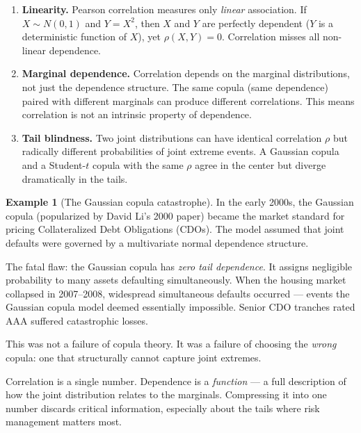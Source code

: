 \documentclass[11pt, a4paper]{article}
\theoremstyle{definition}
\newtheorem{example}{Example}[section]
\theoremstyle{plain}
\theoremstyle{remark}
\begin{document}
\begin{enumerate}
    \item \textbf{Linearity.}
    Pearson correlation measures only \emph{linear} association.
    If $X \sim N(0,1)$ and $Y = X^2$, then $X$ and $Y$ are perfectly dependent ($Y$ is a deterministic function of $X$),
    yet $\rho(X, Y) = 0$.
    Correlation misses all non-linear dependence.

    \item \textbf{Marginal dependence.}
    Correlation depends on the marginal distributions, not just the dependence structure.
    The same copula (same dependence) paired with different marginals can produce different correlations.
    This means correlation is not an intrinsic property of dependence.

    \item \textbf{Tail blindness.}
    Two joint distributions can have identical correlation $\rho$ but radically different
    probabilities of joint extreme events.
    A Gaussian copula and a Student-$t$ copula with the same $\rho$ agree in the center
    but diverge dramatically in the tails.
\end{enumerate}

\begin{example}[The Gaussian copula catastrophe]\label{ex:gaussian-copula}
In the early 2000s, the Gaussian copula (popularized by David Li's 2000 paper)
became the market standard for pricing Collateralized Debt Obligations (CDOs).
The model assumed that joint defaults were governed by a multivariate normal dependence structure.

The fatal flaw: the Gaussian copula has \emph{zero tail dependence}.
It assigns negligible probability to many assets defaulting simultaneously.
When the housing market collapsed in 2007--2008, widespread simultaneous defaults occurred ---
events the Gaussian copula model deemed essentially impossible.
Senior CDO tranches rated AAA suffered catastrophic losses.

This was not a failure of copula theory.
It was a failure of choosing the \emph{wrong} copula: one that structurally cannot capture joint extremes.
\end{example}

\begin{warningbox}
Correlation is a single number.
Dependence is a \emph{function} --- a full description of how the joint distribution relates to the marginals.
Compressing it into one number discards critical information,
especially about the tails where risk management matters most.
\end{warningbox}
\end{document}
